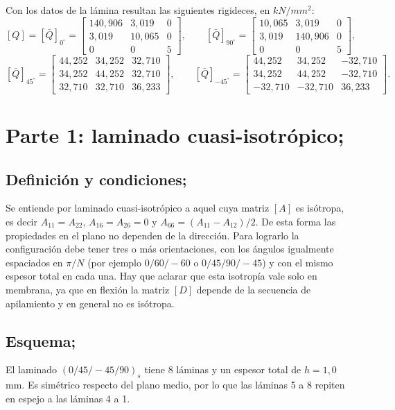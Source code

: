 \documentclass[11pt,a4paper]{article}
\newcommand{\Eeq}{\si{kN/mm^2}}
\begin{document}
Con los datos de la lámina resultan las siguientes rigideces, en $\Eeq$:
\[
[Q]=[\bar Q]_{0^\circ}=\begin{bmatrix}140{,}906&3{,}019&0\\3{,}019&10{,}065&0\\0&0&5\end{bmatrix},\qquad
[\bar Q]_{90^\circ}=\begin{bmatrix}10{,}065&3{,}019&0\\3{,}019&140{,}906&0\\0&0&5\end{bmatrix},
\]
\[
[\bar Q]_{45^\circ}=\begin{bmatrix}44{,}252&34{,}252&32{,}710\\34{,}252&44{,}252&32{,}710\\32{,}710&32{,}710&36{,}233\end{bmatrix},\qquad
[\bar Q]_{-45^\circ}=\begin{bmatrix}44{,}252&34{,}252&-32{,}710\\34{,}252&44{,}252&-32{,}710\\-32{,}710&-32{,}710&36{,}233\end{bmatrix}.
\]

\section{Parte 1: laminado cuasi-isotrópico;}

\subsection{Definición y condiciones;}
Se entiende por laminado cuasi-isotrópico a aquel cuya matriz $[A]$ es isótropa, es decir $A_{11}=A_{22}$, $A_{16}=A_{26}=0$ y $A_{66}=(A_{11}-A_{12})/2$. De esta forma las propiedades en el plano no dependen de la dirección. Para lograrlo la configuración debe tener tres o más orientaciones, con los ángulos igualmente espaciados en $\pi/N$ (por ejemplo $0/60/-60$ o $0/45/90/-45$) y con el mismo espesor total en cada una. Hay que aclarar que esta isotropía vale solo en membrana, ya que en flexión la matriz $[D]$ depende de la secuencia de apilamiento y en general no es isótropa.

\subsection{Esquema;}
El laminado $(0/45/-45/90)_s$ tiene 8 láminas y un espesor total de $h=1{,}0$ mm. Es simétrico respecto del plano medio, por lo que las láminas 5 a 8 repiten en espejo a las láminas 4 a 1.
\end{document}
